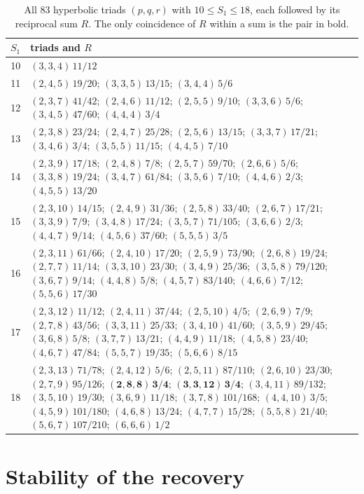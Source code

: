 \documentclass[pdflatex,sn-mathphys-num]{sn-jnl}
\theoremstyle{thmstyleone}%
\theoremstyle{thmstylethree}%
\begin{document}
\begin{table}[ht]
\caption{All $83$ hyperbolic triads $(p,q,r)$ with $10\le S_1\le18$, each followed by its reciprocal sum $R$. The only coincidence of $R$ within a sum is the pair in bold.}\label{tab:enum}
\centering\footnotesize
\begin{tabular}{@{}rp{}@{}}
\toprule
$S_1$ & triads and $R$\\
\midrule
10 & $(3,3,4)\,11/12$ \\
11 & $(2,4,5)\,19/20$; $(3,3,5)\,13/15$; $(3,4,4)\,5/6$ \\
12 & $(2,3,7)\,41/42$; $(2,4,6)\,11/12$; $(2,5,5)\,9/10$; $(3,3,6)\,5/6$; $(3,4,5)\,47/60$; $(4,4,4)\,3/4$ \\
13 & $(2,3,8)\,23/24$; $(2,4,7)\,25/28$; $(2,5,6)\,13/15$; $(3,3,7)\,17/21$; $(3,4,6)\,3/4$; $(3,5,5)\,11/15$; $(4,4,5)\,7/10$ \\
14 & $(2,3,9)\,17/18$; $(2,4,8)\,7/8$; $(2,5,7)\,59/70$; $(2,6,6)\,5/6$; $(3,3,8)\,19/24$; $(3,4,7)\,61/84$; $(3,5,6)\,7/10$; $(4,4,6)\,2/3$; $(4,5,5)\,13/20$ \\
15 & $(2,3,10)\,14/15$; $(2,4,9)\,31/36$; $(2,5,8)\,33/40$; $(2,6,7)\,17/21$; $(3,3,9)\,7/9$; $(3,4,8)\,17/24$; $(3,5,7)\,71/105$; $(3,6,6)\,2/3$; $(4,4,7)\,9/14$; $(4,5,6)\,37/60$; $(5,5,5)\,3/5$ \\
16 & $(2,3,11)\,61/66$; $(2,4,10)\,17/20$; $(2,5,9)\,73/90$; $(2,6,8)\,19/24$; $(2,7,7)\,11/14$; $(3,3,10)\,23/30$; $(3,4,9)\,25/36$; $(3,5,8)\,79/120$; $(3,6,7)\,9/14$; $(4,4,8)\,5/8$; $(4,5,7)\,83/140$; $(4,6,6)\,7/12$; $(5,5,6)\,17/30$ \\
17 & $(2,3,12)\,11/12$; $(2,4,11)\,37/44$; $(2,5,10)\,4/5$; $(2,6,9)\,7/9$; $(2,7,8)\,43/56$; $(3,3,11)\,25/33$; $(3,4,10)\,41/60$; $(3,5,9)\,29/45$; $(3,6,8)\,5/8$; $(3,7,7)\,13/21$; $(4,4,9)\,11/18$; $(4,5,8)\,23/40$; $(4,6,7)\,47/84$; $(5,5,7)\,19/35$; $(5,6,6)\,8/15$ \\
18 & $(2,3,13)\,71/78$; $(2,4,12)\,5/6$; $(2,5,11)\,87/110$; $(2,6,10)\,23/30$; $(2,7,9)\,95/126$; $\mathbf{(2,8,8)\,3/4}$; $\mathbf{(3,3,12)\,3/4}$; $(3,4,11)\,89/132$; $(3,5,10)\,19/30$; $(3,6,9)\,11/18$; $(3,7,8)\,101/168$; $(4,4,10)\,3/5$; $(4,5,9)\,101/180$; $(4,6,8)\,13/24$; $(4,7,7)\,15/28$; $(5,5,8)\,21/40$; $(5,6,7)\,107/210$; $(6,6,6)\,1/2$ \\
\bottomrule
\end{tabular}
\end{table}

\section{Stability of the recovery}\label{sec:stability}\label{sec:certificates}
\end{document}

